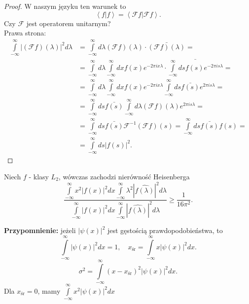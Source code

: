 \documentclass[../main.tex]{subfiles}
\begin{document}
    \begin{proof}
        W naszym języku ten warunek to
        \[
            \left<f|f \right> = \left<\mathcal{F}f | \mathcal{F}f \right>
        .\]
    Czy $\mathcal{F}$ jest operatorem unitarnym?\\
        Prawa strona:
        \begin{align*}
            \int\limits_{-\infty}^{\infty} \left|\left(\mathcal{F}f\right)(\lambda)\right|^2d\lambda &= \int\limits_{-\infty}^{\infty} d\lambda \left( \mathcal{F}f \right) (\lambda)\cdot \bar{(\mathcal{F}f)(\lambda)} =\\
            &=\int\limits_{-\infty}^{\infty} d\lambda \int\limits_{-\infty}^{\infty} dx f(x) e^{-2\pi i x \lambda} \cdot \bar{\int\limits_{-\infty}^{\infty} ds f(s) e^{-2\pi i s \lambda}} = \\
            &= \int\limits_{-\infty}^{\infty} d\lambda \int\limits_{-\infty}^{\infty} dx f(x) e^{-2\pi i x \lambda}\int\limits_{-\infty}^{\infty} ds \bar{f(s)}e^{2\pi i s \lambda} = \\
            &= \int\limits_{-\infty}^{\infty} ds \bar{f(s)}\int\limits_{-\infty}^{\infty} d\lambda (\mathcal{F}f)(\lambda)e^{2\pi i s \lambda} = \\
            &= \int\limits_{-\infty}^{\infty} ds \bar{f(s)} \mathcal{F}^{-1}(\mathcal{F}f)(s) = \int\limits_{-\infty}^{\infty} ds \bar{f(s)} f(s) = \\
            &= \int\limits_{-\infty}^{\infty} ds \left| f(s) \right| ^2
        .\end{align*}
    \end{proof}
    \begin{stw}
        Niech $f$ - klasy $L_2$, wówczas zachodzi nierówność Heisenberga
        \[
            \frac{\int\limits_{-\infty}^{\infty} x^2 \left| f(x) \right| ^2 dx \int\limits_{-\infty}^{\infty} \lambda^2 \left| \widehat{f(\lambda)} \right| ^2 d\lambda}{\int\limits_{-\infty}^{\infty} \left| f(x) \right| ^2 dx \int\limits_{-\infty}^{\infty} \left| \widehat{f(\lambda)} \right| ^2 d\lambda } \ge \frac{1}{16\pi^2}
        .\]
    \end{stw}
    \textbf{Przypomnienie:} jeżeli $\left| \psi(x) \right| ^2$ jest gęstością prawdopodobieństwa, to
    \[
        \int\limits_{-\infty}^{\infty} \left| \psi(x) \right| ^2 dx = 1,\quad x_{\text{śr}} = \int\limits_{-\infty}^{\infty}  x \left| \psi(x) \right| ^2 dx
    .\]
\[
    \sigma^2 = \int\limits_{-\infty}^{\infty} (x-x_{\text{śr}})^2 \left| \psi(x) \right| ^2 dx
.\]
Dla $x_{\text{śr}} = 0$, mamy $\int\limits_{-\infty}^{\infty} x^2 \left| \psi(x) \right| ^2 dx $
\end{document}
